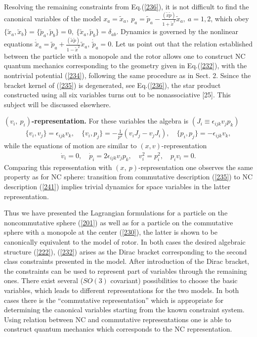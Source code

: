 \documentclass[paper a4]{article}
\begin{document}
Resolving the remaining constraints from Eq.(\ref{236}), it is not
difficult to find the canonical variables of the model
$x_a=\tilde x_a, ~  p_a=\tilde p_a-\frac{(\tilde x \tilde p)}
{1+\tilde x^2}\tilde x_a, ~ a=1, 2$,
which obey $\{\tilde x_a, \tilde x_b\}=\{\tilde p_a, \tilde p_b\}=0,
~ \{\tilde x_a, \tilde p_b\}=\delta_{ab}$.
Dynamics is governed by the nonlinear equations
$\dot{\tilde x}_a=\tilde p_a+ \frac{(\tilde x \tilde p)}{1-\tilde x^2}
\tilde x_a, ~
\dot{\tilde p}_a=0$.
Let us point out that the relation established between the particle with
a monopole and the
rotor allows one to construct NC quantum mechanics corresponding to
the geometry given in Eq.(\ref{232}),
with the nontrivial potential (\ref{234}), following the same procedure
as in Sect. 2. Ssince the bracket kernel of (\ref{235})
is degenerated,
see Eq.(\ref{236}), the star product constructed using all six variables
turns out to be nonassociative [25]. This subject will be discussed
elsewhere.

{\bf $(v_i, ~ p_i)$-representation.} For these variables the algebra is
$(J_i\equiv\epsilon_{ijk}v_jp_k)$
\begin{eqnarray}\label{241}
\{v_i, v_j\}=\epsilon_{ijk}v_k, \quad
\{v_i, p_j\}=-\frac{1}{p^2}(v_iJ_j-v_jJ_i), \quad
\{p_i, p_j\}=-\epsilon_{ijk}v_k,
\end{eqnarray}
while the equations of motion are similar to $(x, v)$-representation
\begin{eqnarray}\label{242}
\dot v_i=0, \quad \dot p_i=2\epsilon_{ijk}v_jp_k, \quad
v_i^2=p_i^2, \quad p_iv_i=0.
\end{eqnarray}
Comparing this representation with $(x, ~ p)$-representation one
observes the same property as for NC sphere: transition from commutative
description (\ref{235}) to NC description (\ref{241}) implies trivial
dynamics for space variables in the latter representation.

Thus we have presented the Lagrangian formulations for a
particle on the noncommutative sphere (\ref{201}) as well as for a
particle on the commutative sphere with a monopole at the
center (\ref{230}), the latter is shown to be canonically equivalent
to the model of rotor.
In both cases the desired algebraic structure (\ref{222}), (\ref{232})
arises as the Dirac bracket corresponding to
the second class constraints
presented in the model. After introduction of the Dirac bracket, the
constraints can be used to represent part of variables through the
remaining ones. There exist several ($SO(3)$ covariant)
possibilities to choose the basic variables, which leads to different
representations for the two models. In both cases there is the
``commutative representation'' which is appropriate for determining
the canonical variables starting from the known constraint system.
Using relation
between NC and commutative representations one is able to construct
quantum mechanics which corresponds to the NC representation.
\end{document}
